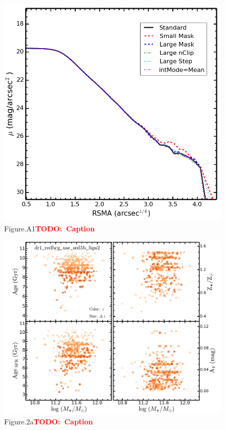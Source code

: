 \documentclass[preprint]{aastex}
\newcommand{\todo}[1]{\textcolor{red}{\textbf{TODO:~#1}}}
\begin{document}
\begin{CJK*}{UTF8}{gbsn}
\clearpage
{}
\begin{figure}
    \centering 
    \includegraphics[width=14.0cm]{fig/redbcg_1_HSC-I_full_imgsub_ellip_default_compare.png}
    \caption{Figure.A1\todo{Caption}}\label{figure:A1}
\end{figure}

\clearpage
{}
\begin{figure}
    \centering 
    \includegraphics[width=11.5cm]{fig/dr1_redbcg_use_sed5b_fsps2_logm_plots}
    \caption{Figure.2a\todo{Caption}}\label{figure:2a}
\end{figure}


\end{CJK*}
\end{document}

